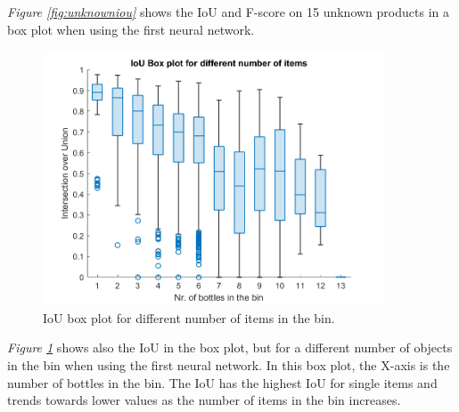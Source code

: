 \textit{Figure \ref{fig:unknowniou}} shows the IoU and F-score on 15 unknown products in a box plot when using the first neural network.
\begin{figure}[h]
 \centering
 \includegraphics[width=0.9\textwidth]{graphics/results/boxplotBottles.png}
 \caption{IoU box plot for different number of items in the bin.}
 \label{fig:bottles}
\end{figure}

\textit{Figure \ref{fig:bottles}} shows also the IoU in the box plot, but for a different number of objects in the bin when using the first neural network. In this box plot, the X-axis is the number of bottles in the bin. The IoU has the highest IoU for single items and trends towards lower values as the number of items in the bin increases.

